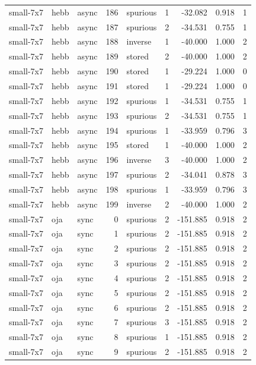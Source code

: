 \begin{tabular}{lllrlrrrr}
small-7x7 & hebb & async & 186 & spurious & 1 & -32.082 & 0.918 & 1 \\
small-7x7 & hebb & async & 187 & spurious & 2 & -34.531 & 0.755 & 1 \\
small-7x7 & hebb & async & 188 & inverse & 1 & -40.000 & 1.000 & 2 \\
small-7x7 & hebb & async & 189 & stored & 2 & -40.000 & 1.000 & 2 \\
small-7x7 & hebb & async & 190 & stored & 1 & -29.224 & 1.000 & 0 \\
small-7x7 & hebb & async & 191 & stored & 1 & -29.224 & 1.000 & 0 \\
small-7x7 & hebb & async & 192 & spurious & 1 & -34.531 & 0.755 & 1 \\
small-7x7 & hebb & async & 193 & spurious & 2 & -34.531 & 0.755 & 1 \\
small-7x7 & hebb & async & 194 & spurious & 1 & -33.959 & 0.796 & 3 \\
small-7x7 & hebb & async & 195 & stored & 1 & -40.000 & 1.000 & 2 \\
small-7x7 & hebb & async & 196 & inverse & 3 & -40.000 & 1.000 & 2 \\
small-7x7 & hebb & async & 197 & spurious & 2 & -34.041 & 0.878 & 3 \\
small-7x7 & hebb & async & 198 & spurious & 1 & -33.959 & 0.796 & 3 \\
small-7x7 & hebb & async & 199 & inverse & 2 & -40.000 & 1.000 & 2 \\
small-7x7 & oja & sync & 0 & spurious & 2 & -151.885 & 0.918 & 2 \\
small-7x7 & oja & sync & 1 & spurious & 2 & -151.885 & 0.918 & 2 \\
small-7x7 & oja & sync & 2 & spurious & 2 & -151.885 & 0.918 & 2 \\
small-7x7 & oja & sync & 3 & spurious & 2 & -151.885 & 0.918 & 2 \\
small-7x7 & oja & sync & 4 & spurious & 2 & -151.885 & 0.918 & 2 \\
small-7x7 & oja & sync & 5 & spurious & 2 & -151.885 & 0.918 & 2 \\
small-7x7 & oja & sync & 6 & spurious & 2 & -151.885 & 0.918 & 2 \\
small-7x7 & oja & sync & 7 & spurious & 3 & -151.885 & 0.918 & 2 \\
small-7x7 & oja & sync & 8 & spurious & 1 & -151.885 & 0.918 & 2 \\
small-7x7 & oja & sync & 9 & spurious & 2 & -151.885 & 0.918 & 2 \\

\end{tabular}
